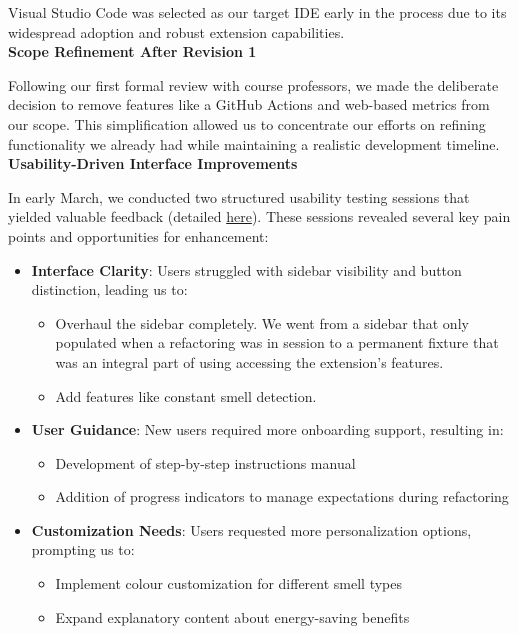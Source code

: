 \documentclass{article}
\begin{document}
Visual Studio Code was selected as our target IDE early in the process due to its widespread adoption and robust extension capabilities.\\


\noindent \textbf{Scope Refinement After Revision 1}

\noindent
Following our first formal review with course professors, we made the deliberate decision to remove features like a GitHub Actions and web-based metrics from our scope. This simplification allowed us to concentrate our efforts on refining functionality we already had while maintaining a realistic development timeline.\\


\noindent \textbf{Usability-Driven Interface Improvements}

\noindent
In early March, we conducted two structured usability testing sessions that yielded valuable feedback (detailed \href{https://github.com/ssm-lab/capstone--source-code-optimizer/blob/main/docs/Extras/UsabilityTesting/UsabilityTestingReport.pdf}{here}). These sessions revealed several key pain points and opportunities for enhancement:

\begin{itemize}
    \item \textbf{Interface Clarity}: Users struggled with sidebar visibility and button distinction, leading us to:
    \begin{itemize}
        \item Overhaul the sidebar completely. We went from a sidebar that only populated when a refactoring was in session to a permanent fixture that was an integral part of using accessing the extension's features.
        \item Add features like constant smell detection.
    \end{itemize}
    
    \item \textbf{User Guidance}: New users required more onboarding support, resulting in:
    \begin{itemize}
        \item Development of step-by-step instructions manual
        \item Addition of progress indicators to manage expectations during refactoring
    \end{itemize}
    
    \item \textbf{Customization Needs}: Users requested more personalization options, prompting us to:
    \begin{itemize}
        \item Implement colour customization for different smell types
        \item Expand explanatory content about energy-saving benefits
    \end{itemize}
\end{itemize}
\end{document}
